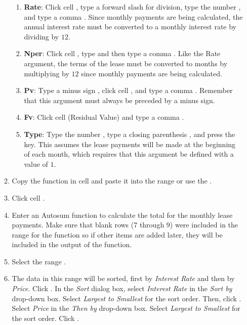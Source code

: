 \begin{enumbox}
\begin{enumerate}
\begin{enumerate}
			\begin{enumerate}
				\item \textbf{Rate}: Click cell , type a forward slash \fmtTyping{/} for division, type the number , and type a comma \fmtTyping{,}. Since monthly payments are being calculated, the annual interest rate must be converted to a monthly interest rate by dividing by $ 12 $.
				
				\item \textbf{Nper}: Click cell , type  and then type a comma \fmtTyping{,}. Like the Rate argument, the terms of the lease must be converted to months by multiplying by $ 12 $ since monthly payments are being calculated.
				
				\item \textbf{Pv}: Type a minus sign \fmtTyping{-}, click cell , and type a comma \fmtTyping{,}. Remember that this argument must always be preceded by a minus sign.
				
				\item \textbf{Fv}: Click cell  (Residual Value) and type a comma \fmtTyping{,}.
				
				\item \textbf{Type}: Type the number , type a closing parenthesis \fmtTyping{)}, and press the  key. This assumes the lease payments will be made at the beginning of each month, which requires that this argument be defined with a value of $ 1 $.
			\end{enumerate}
		
			\item Copy the  function in cell  and paste it into the range  or use the .
			
			\item Click cell . 
			
			\item Enter an Autosum function to calculate the total for the monthly lease payments. Make sure that blank rows (7 through 9) were included in the range for the  function so if other items are added later, they will be included in the output of the  function.
			
			\item Select the range . 
			
			\item The data in this range will be sorted, first by \textit{Interest Rate} and then by \textit{Price}. Click . In the \textit{Sort} dialog box, select \textit{Interest Rate} in the \textit{Sort by} drop-down box. Select \textit{Largest to Smallest} for the sort order. Then, click . Select \textit{Price} in the \textit{Then by} drop-down box. Select \textit{Largest to Smallest} for the sort order. Click .
		

\end{enumerate}
\end{enumerate}
\end{enumbox}
